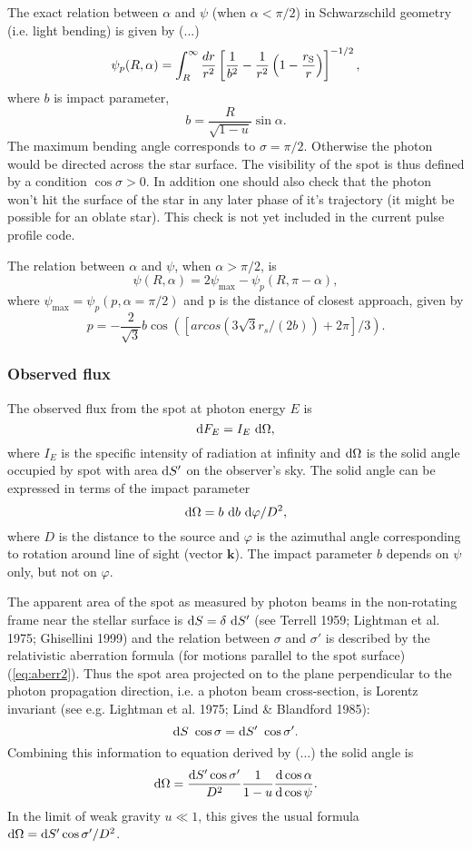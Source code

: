 \documentclass{wihuri}
\def\rg{r_{\rm S}} %
\def\be{\begin{equation}}
\def\ee{\end{equation}}
\def\d{{\rm d}}
\def\rg{r_{\rm S}} %
\def\Dop{\delta}
\newcommand{\bmath}[1]{\boldsymbol{#1}}
\begin{document}
The exact relation between $\alpha$ and $\psi$ (when $\alpha < \pi/2$) in Schwarzschild geometry
(i.e. light bending) is given by (...) %
\be \label{eq:bend2}
  \psi_{p}(R,\alpha)=\int_R^{\infty} \frac{dr}{r^2} \left[ \frac{1}{b^2} -
       \frac{1}{r^2}\left( 1- \frac{\rg}{r}\right)\right]^{-1/2} ,
\ee
where $b$ is impact parameter,
\be \label{eq:impact2}
  b=\frac{R}{\sqrt{1-u}} \sin\alpha .
\ee
The maximum bending angle corresponds to $\sigma=\pi/2$. Otherwise the photon would be directed across the star surface. 
The visibility of the spot is thus defined by a condition $\cos \sigma>0$. In addition one should also check that the photon won't hit the surface of the star in any later phase of it's trajectory (it might be possible for an oblate star). This check is not yet included in the current pulse profile code.

The relation between  $\alpha$ and $\psi$, when $\alpha > \pi/2$, is 
\be 
\psi(R,\alpha)=2\psi_{\max}-\psi_{p}(R,\pi-\alpha),
\ee 
where $\psi_{\max} = \psi_{p}(p,\alpha=\pi/2)$ and p is the distance of closest approach, given by
\be
p = -\frac{2}{\sqrt{3}}b\cos([arcos(3\sqrt{3}r_{s}/(2b))+2\pi]/3).
\ee




\subsubsection{Observed flux}


The observed flux from the spot 
at photon energy $E$ is
\be
\label{eq:dF_E2}
  \d F_E=I_E\ \d\Omega,
\ee
where $I_E$ is the specific   intensity of radiation
at infinity and $\d\Omega$ is
the solid angle occupied by spot with area $\d S'$ on the observer's sky.
The solid angle can be expressed in terms of the impact parameter
\be
\d\Omega=b\ \d b\ \d\varphi/D^2,
\ee
where $D$ is the distance to the source and $\varphi$ is the azimuthal
angle corresponding to rotation around line of sight (vector $\bmath{k}$).
The impact parameter $b$ depends on $\psi$ only, but not on $\varphi$.

The apparent area of the spot as measured by photon beams
in the non-rotating frame near the stellar surface is $\d S=\Dop\ \d S'$
(see Terrell 1959; Lightman et al. 1975; Ghisellini 1999) 
and the relation between $\sigma$ and $\sigma'$ is described 
by the relativistic aberration formula (for motions parallel to the 
spot surface) (\ref{eq:aberr2}). Thus the spot area projected on to the plane perpendicular 
to the photon propagation direction, i.e. a photon beam cross-section,
is Lorentz invariant (see e.g.  Lightman et al. 1975; 
Lind \& Blandford 1985): 
\be \label{eq:Salpha2}
\d S\ \cos\sigma = \d S'\ \cos\sigma' . 
\ee
Combining this information to equation derived by (...)%
 the solid angle is 
\be\label{eq:omega2}
 \d\Omega=\frac{\d S' \cos \sigma'}{D^2} \frac{1}{1-u} \frac{\d\cos\alpha}{\d\cos\psi}.
\ee
In the limit of weak gravity $u\ll 1$, this gives
the usual formula $\d\Omega=\d S' \cos \sigma'/D^2$.
\end{document}
